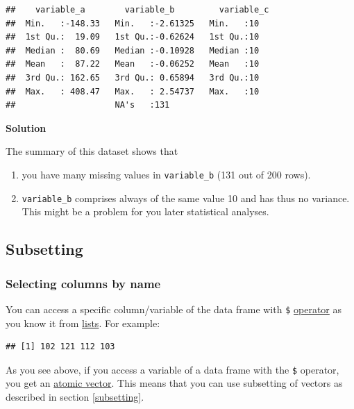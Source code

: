 \documentclass[
]{scrartcl}
\newenvironment{Shaded}{\begin{snugshade}}{\end{snugshade}}
\newcommand{\NormalTok}[1]{#1}
\newcommand{\SpecialCharTok}[1]{\textcolor[rgb]{0.81,0.36,0.00}{\textbf{#1}}}
\providecommand{\tightlist}{%
  \setlength{\itemsep}{0pt}\setlength{\parskip}{0pt}}
\newenvironment{webexsolution}[1]
    {\par\tiny\textbf{#1}}
    {\par}
\newcommand{\webexhide}[1]{\begin{webexsolution}{#1}}
\newcommand{\webexunhide}{\end{webexsolution}}
\begin{document}
\begin{verbatim}
##    variable_a        variable_b         variable_c
##  Min.   :-148.33   Min.   :-2.61325   Min.   :10  
##  1st Qu.:  19.09   1st Qu.:-0.62624   1st Qu.:10  
##  Median :  80.69   Median :-0.10928   Median :10  
##  Mean   :  87.22   Mean   :-0.06252   Mean   :10  
##  3rd Qu.: 162.65   3rd Qu.: 0.65894   3rd Qu.:10  
##  Max.   : 408.47   Max.   : 2.54737   Max.   :10  
##                    NA's   :131
\end{verbatim}

\webexhide{Solution}

The summary of this dataset shows that

\begin{enumerate}
\def\labelenumi{\arabic{enumi}.}
\tightlist
\item
  you have many missing values in \texttt{variable\_b} (131 out of 200 rows).
\item
  \texttt{variable\_b} comprises always of the same value 10 and has thus no variance. This might be a problem for you later statistical analyses.
\end{enumerate}

\webexunhide

\subsection{Subsetting}\label{nolabel}

\subsubsection{Selecting columns by name}\label{selectbyname}

You can access a specific column/variable of the data frame with \texttt{\$} \hyperref[listsdollar]{operator} as you know it from \hyperref[lists]{lists}. For example:

\begin{Shaded}
\end{Shaded}

\begin{verbatim}
## [1] 102 121 112 103
\end{verbatim}

As you see above, if you access a variable of a data frame with the \texttt{\$} operator, you get an \hyperref[vectors]{atomic vector}. This means that you can use subsetting of vectors as described in section \ref{subsetting}.
\end{document}

